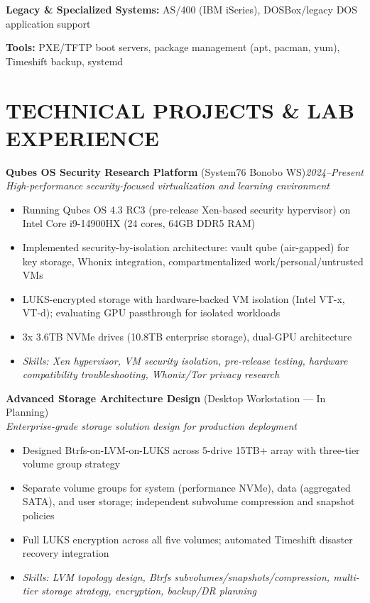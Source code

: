 \documentclass[9pt,letterpaper]{extarticle}
\begin{document}
\noindent\textbf{Legacy \& Specialized Systems:} AS/400 (IBM iSeries), DOSBox/legacy DOS application support

\noindent\textbf{Tools:} PXE/TFTP boot servers, package management (apt, pacman, yum), Timeshift backup, systemd

\newpage
\section*{TECHNICAL PROJECTS \& LAB EXPERIENCE}

\noindent\textbf{Qubes OS Security Research Platform} (System76 Bonobo WS)\hfill\textit{2024--Present}\\
\textit{High-performance security-focused virtualization and learning environment}
\begin{itemize}[beginpenalty=10000, topsep=0pt]
  \item Running Qubes OS 4.3 RC3 (pre-release Xen-based security hypervisor) on Intel Core i9-14900HX (24 cores, 64GB DDR5 RAM)
  \item Implemented security-by-isolation architecture: vault qube (air-gapped) for key storage, Whonix integration, compartmentalized work/personal/untrusted VMs
  \item LUKS-encrypted storage with hardware-backed VM isolation (Intel VT-x, VT-d); evaluating GPU passthrough for isolated workloads
  \item 3x 3.6TB NVMe drives (10.8TB enterprise storage), dual-GPU architecture
  \item \textit{Skills: Xen hypervisor, VM security isolation, pre-release testing, hardware compatibility troubleshooting, Whonix/Tor privacy research}
\end{itemize}

\vspace{4pt}
\noindent\textbf{Advanced Storage Architecture Design} (Desktop Workstation --- In Planning)\\
\textit{Enterprise-grade storage solution design for production deployment}
\begin{itemize}
  \item Designed Btrfs-on-LVM-on-LUKS across 5-drive 15TB+ array with three-tier volume group strategy
  \item Separate volume groups for system (performance NVMe), data (aggregated SATA), and user storage; independent subvolume compression and snapshot policies
  \item Full LUKS encryption across all five volumes; automated Timeshift disaster recovery integration
  \item \textit{Skills: LVM topology design, Btrfs subvolumes/snapshots/compression, multi-tier storage strategy, encryption, backup/DR planning}
\end{itemize}
\end{document}
